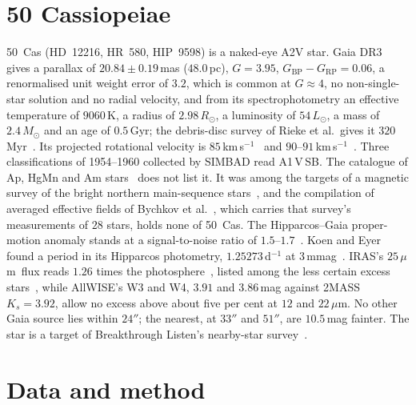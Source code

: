 \documentclass[3p,11pt]{elsarticle}
\newcommand{\um}{\,$\mu$m}
\newcommand{\kms}{km\,s$^{-1}$}
\newcommand{\Msun}{M_\odot}
\newcommand{\Rsun}{R_\odot}
\begin{document}
\section{50 Cassiopeiae}\label{sec:star}

50~Cas (HD~12216, HR~580, HIP~9598) is a naked-eye A2V star. Gaia DR3~\cite{Gaia2023}
gives a parallax of $20.84\pm0.19$\,mas ($48.0$\,pc), $G=3.95$,
$G_\mathrm{BP}-G_\mathrm{RP}=0.06$, a renormalised unit weight error of $3.2$, which is
common at $G\approx4$, no non-single-star solution and no radial velocity, and from its
spectrophotometry an effective temperature of $9060$\,K, a radius of $2.98\,\Rsun$, a
luminosity of $54\,L_\odot$, a mass of $2.4\,\Msun$ and an age of $0.5$\,Gyr; the
debris-disc survey of Rieke et al.\ gives it $320$\,Myr~\cite{Rieke2005}. Its projected
rotational velocity is $85$\,\kms~\cite{AbtMorrell1995} and $90$--$91$\,\kms~\cite{Royer2002,Royer2007}.
Three classifications of 1954--1960 collected by SIMBAD read A1\,V\,SB. The catalogue of
Ap, HgMn and Am stars~\cite{RensonManfroid2009} does not list it. It was among the targets
of a magnetic survey of the bright northern main-sequence stars~\cite{Monin2002}, and the
compilation of averaged effective fields of Bychkov et al.~\cite{Bychkov2003}, which
carries that survey's measurements of $28$ stars, holds none of 50~Cas. The
Hipparcos--Gaia proper-motion anomaly stands at a signal-to-noise ratio of
$1.5$--$1.7$~\cite{Kervella2022}. Koen and Eyer found a period in its Hipparcos
photometry, $1.25273$\,d$^{-1}$ at $3$\,mmag~\cite{KoenEyer2002}. IRAS's $25$\um\ flux
reads $1.26$ times the photosphere~\cite{Rieke2005}, listed among the less certain excess
stars~\cite{CottenSong2016}, while AllWISE's W3 and W4, $3.91$ and $3.86$\,mag against
2MASS $K_s=3.92$, allow no excess above about five per cent at $12$ and $22$\um. No other
Gaia source lies within $24''$; the nearest, at $33''$ and $51''$, are $10.5$\,mag
fainter. The star is a target of Breakthrough Listen's nearby-star
survey~\cite{Isaacson2017}.

\section{Data and method}\label{sec:method}
\end{document}
